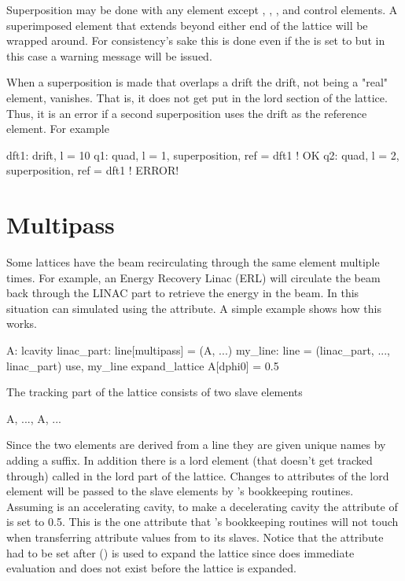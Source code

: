 Superposition may be done with any element except ,
, , and  control elements. A superimposed element that
extends beyond either end of the lattice will be wrapped around. For consistency's sake
this is done even if the  is set to  but in this case
a warning message will be issued.

When a superposition is made that overlaps a drift the drift, not being a "real" 
element, vanishes. That is, it does not get put in the lord section of the lattice.
Thus, it is an error if a second superposition uses the drift as the reference element.
For example
\begin{example}
  dft1: drift, l = 10
  q1: quad, l = 1, superposition, ref = dft1   ! OK 
  q2: quad, l = 2, superposition, ref = dft1   ! ERROR! 
\end{example}

\section{Multipass}
\label{s:multipass}

Some lattices have the beam recirculating through the same element
multiple times. For example, an Energy Recovery Linac (ERL) will
circulate the beam back through the LINAC part to retrieve the energy
in the beam. In \bmad this situation can simulated using the
 attribute. A simple example shows how this works.
\begin{example}
  A: lcavity
  linac_part: line[multipass] = (A, ...)
  my_line: line = (linac_part, ..., linac_part)
  use, my_line
  expand_lattice
  A[dphi0] = 0.5
\end{example}
The tracking part of the lattice consists of two slave elements
\begin{example}
  A, ..., A, ...
\end{example}
Since the two elements are derived from a  line they are
given unique names by adding a  suffix. In addition there is
a lord element (that doesn't get tracked through) called  in the
lord part of the lattice. Changes to attributes of the lord 
element will be passed to the slave elements by \bmad's bookkeeping
routines. Assuming  is an accelerating cavity, to make
 a decelerating cavity the  attribute of
 is set to 0.5. This is the one attribute that \bmad's
bookkeeping routines will not touch when transferring attribute values
from  to its slaves. Notice that the  attribute had to
be set after  ()
is used to expand the lattice since
\bmad does immediate evaluation and  does not exist before
the lattice is expanded.

